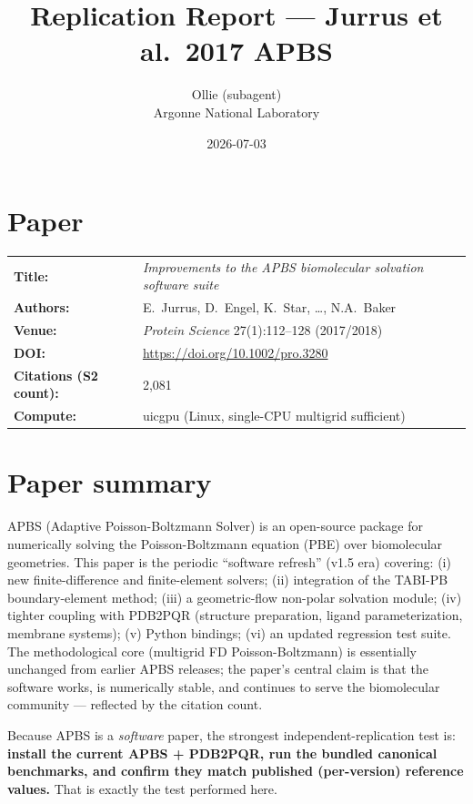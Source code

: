\documentclass[11pt]{article}
\title{Replication Report --- Jurrus et al.\ 2017 APBS}
\author{Ollie (subagent) \\ Argonne National Laboratory}
\date{2026-07-03}
\begin{document}
\maketitle

\section*{Paper}
\begin{tabular}{ll}
\textbf{Title:} & \emph{Improvements to the APBS biomolecular solvation software suite} \\
\textbf{Authors:} & E.\ Jurrus, D.\ Engel, K.\ Star, \ldots, N.A.\ Baker \\
\textbf{Venue:} & \emph{Protein Science} 27(1):112--128 (2017/2018) \\
\textbf{DOI:} & \url{https://doi.org/10.1002/pro.3280} \\
\textbf{Citations (S2 count):} & 2{,}081 \\
\textbf{Compute:} & uicgpu (Linux, single-CPU multigrid sufficient) \\
\end{tabular}

\section{Paper summary}

APBS (Adaptive Poisson-Boltzmann Solver) is an open-source package for
numerically solving the Poisson-Boltzmann equation (PBE) over biomolecular
geometries. This paper is the periodic ``software refresh'' (v1.5 era)
covering: (i) new finite-difference and finite-element solvers; (ii)
integration of the TABI-PB boundary-element method; (iii) a geometric-flow
non-polar solvation module; (iv) tighter coupling with PDB2PQR (structure
preparation, ligand parameterization, membrane systems); (v) Python
bindings; (vi) an updated regression test suite. The methodological core
(multigrid FD Poisson-Boltzmann) is essentially unchanged from earlier
APBS releases; the paper's central claim is that the software works, is
numerically stable, and continues to serve the biomolecular community ---
reflected by the citation count.

Because APBS is a \emph{software} paper, the strongest independent-replication
test is: \textbf{install the current APBS + PDB2PQR, run the bundled canonical
benchmarks, and confirm they match published (per-version) reference values.}
That is exactly the test performed here.
\end{document}
